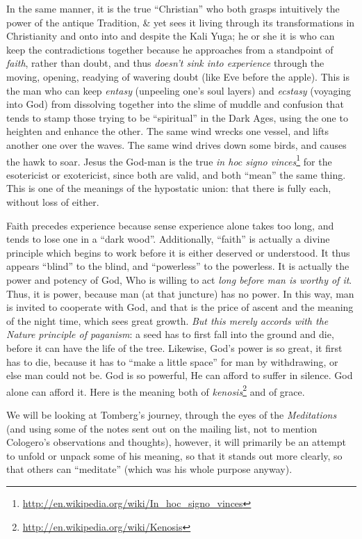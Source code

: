 In the same manner, it is the true ``Christian'' who both grasps intuitively the power of the antique Tradition, \& yet sees it living through its transformations in Christianity and onto into and despite the Kali Yuga; he or she it is who can keep the contradictions together because he approaches from a standpoint of \emph{faith}, rather than doubt, and thus \emph{doesn't sink into experience} through the moving, opening, readying of wavering doubt (like Eve before the apple). This is the man who can keep \emph{entasy} (unpeeling one's soul layers) and
\emph{ecstasy} (voyaging into God) from dissolving together into the slime of muddle and confusion that tends to stamp those trying to be ``spiritual'' in the Dark Ages, using the one to heighten and enhance the other. The same wind wrecks one vessel, and lifts another one over the waves. The same wind drives down some birds, and causes the hawk to soar. Jesus the God-man is the true \emph{in hoc signo vinces}\footnote{\url{http://en.wikipedia.org/wiki/In\_hoc\_signo\_vinces}} for the esotericist or exotericist, since both are valid, and both ``mean'' the same thing. This is one of the meanings of the hypostatic union: that there is fully each, without loss of either.

Faith precedes experience because sense experience alone takes too long, and tends to lose one in a ``dark wood''. Additionally, ``faith'' is actually a divine principle which begins to work before it is either deserved or understood. It thus appears ``blind'' to the blind, and ``powerless'' to the powerless. It is actually the power and potency of God, Who is willing to act \emph{long before man is worthy of it}. Thus, it is power, because man (at that juncture) has no power. In this way, man is invited to cooperate with God, and that is the price of ascent and the meaning of the night time, which sees great growth. \emph{But this merely accords with the Nature principle of paganism}: a seed has to first fall into the ground and die, before it can have the life of the tree. Likewise, God's power is so great, it first has to die, because it has to ``make a little space'' for man by withdrawing, or else man could not be. God is so powerful, He can afford to suffer in silence. God alone can afford it. Here is the meaning both of \emph{kenosis}\footnote{\url{http://en.wikipedia.org/wiki/Kenosis}} and of grace.

We will be looking at Tomberg's journey, through the eyes of the \emph{Meditations} (and using some of the notes sent out on the mailing list, not to mention Cologero's observations and thoughts), however, it will primarily be an attempt to unfold or unpack some of his meaning, so that it stands out more clearly, so that others can ``meditate'' (which was his whole purpose anyway).



